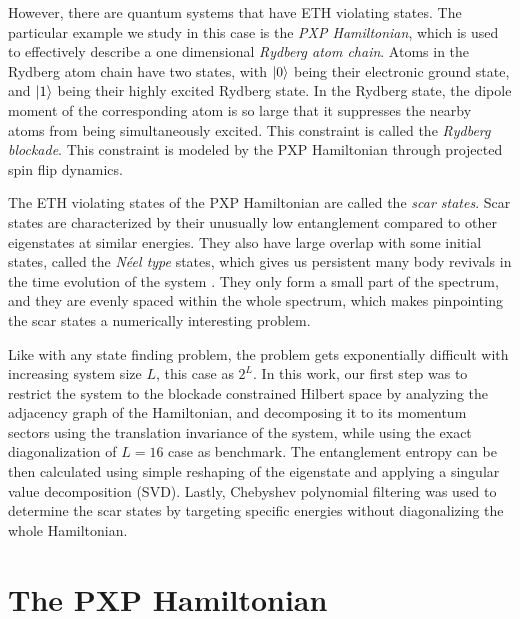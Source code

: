 \documentclass[%
 reprint,
 amsmath,amssymb,
 aps,
]{revtex4-2}
\begin{document}
However, there are quantum systems that have ETH violating states. The particular example we study in this case is the \textit{PXP Hamiltonian}, which is used to effectively describe a one dimensional \textit{Rydberg atom chain}. Atoms in the Rydberg atom chain have two states, with $\ket{0}$ being their electronic ground state, and $\ket{1}$ being their highly excited Rydberg state. In the Rydberg state, the dipole moment of the corresponding atom is so large that it suppresses the nearby atoms from being simultaneously excited. This constraint is called the \textit{Rydberg blockade}. This constraint is modeled by the PXP Hamiltonian through projected spin flip dynamics.

The ETH violating states of the PXP Hamiltonian are called the \textit{scar states}. Scar states are characterized by their unusually low entanglement compared to other eigenstates at similar energies. They also have large overlap with some initial states, called the \textit{N\'eel type} states, which gives us persistent many body revivals in the time evolution of the system \cite{Turner_2018}. They only form a small part of the spectrum, and they are evenly spaced within the whole spectrum, which makes pinpointing the scar states a numerically interesting problem.

Like with any state finding problem, the problem gets exponentially difficult with increasing system size $L$, this case as $2^L$. In this work, our first step was to restrict the system to the blockade constrained Hilbert space by analyzing the adjacency graph of the Hamiltonian, and decomposing it to its momentum sectors using the translation invariance of the system, while using the exact diagonalization of $L = 16$ case as benchmark. The entanglement entropy can be then calculated using simple reshaping of the eigenstate and applying a singular value decomposition (SVD). Lastly, Chebyshev polynomial filtering was used to determine the scar states by targeting specific energies without diagonalizing the whole Hamiltonian.

\section{\label{sec:PXPHamiltonian} The PXP Hamiltonian}
\end{document}
